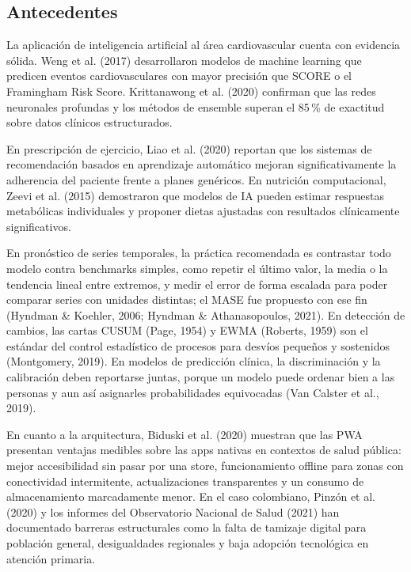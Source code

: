 \documentclass[12pt,letterpaper]{article}
\begin{document}
\subsection*{Antecedentes}

La aplicación de inteligencia artificial al área cardiovascular cuenta con
evidencia sólida. Weng et al. (2017) desarrollaron modelos de machine learning
que predicen eventos cardiovasculares con mayor precisión que SCORE o el
Framingham Risk Score. Krittanawong et al. (2020) confirman que las redes
neuronales profundas y los métodos de ensemble superan el 85\,\% de exactitud
sobre datos clínicos estructurados.

En prescripción de ejercicio, Liao et al. (2020) reportan que los sistemas de
recomendación basados en aprendizaje automático mejoran significativamente la
adherencia del paciente frente a planes genéricos. En nutrición computacional,
Zeevi et al. (2015) demostraron que modelos de IA pueden estimar respuestas
metabólicas individuales y proponer dietas ajustadas con resultados clínicamente
significativos.

En pronóstico de series temporales, la práctica recomendada es contrastar todo
modelo contra benchmarks simples, como repetir el último valor, la media o la
tendencia lineal entre extremos, y medir el error de forma escalada para poder
comparar series con unidades distintas; el MASE fue propuesto con ese fin
(Hyndman \& Koehler, 2006; Hyndman \& Athanasopoulos, 2021). En detección de
cambios, las cartas CUSUM (Page, 1954) y EWMA (Roberts, 1959) son el estándar
del control estadístico de procesos para desvíos pequeños y sostenidos
(Montgomery, 2019). En modelos de predicción clínica, la discriminación y la
calibración deben reportarse juntas, porque un modelo puede ordenar bien a las
personas y aun así asignarles probabilidades equivocadas (Van Calster et al.,
2019).

En cuanto a la arquitectura, Biduski et al. (2020) muestran que las PWA presentan
ventajas medibles sobre las apps nativas en contextos de salud pública: mejor
accesibilidad sin pasar por una store, funcionamiento offline para zonas con
conectividad intermitente, actualizaciones transparentes y un consumo de
almacenamiento marcadamente menor. En el caso colombiano, Pinzón et al. (2020) y
los informes del Observatorio Nacional de Salud (2021) han documentado barreras
estructurales como la falta de tamizaje digital para población general,
desigualdades regionales y baja adopción tecnológica en atención primaria.
\end{document}
